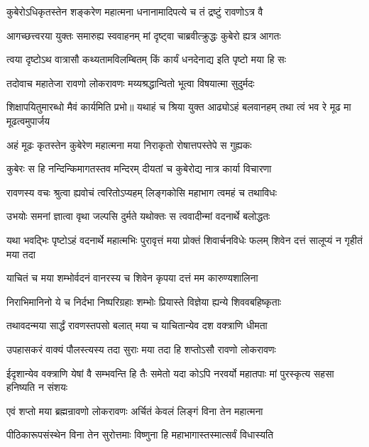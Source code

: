 
\twolineshloka
{कुबेरोऽधिकृतस्तेन शङ्करेण महात्मना}
{धनानामादिपत्ये च तं द्रष्टुं रावणोऽत्र वै}%

\twolineshloka
{आगच्छत्त्वरया युक्तः समारुह्य स्ववाहनम्}
{मां दृष्ट्वा चाब्रवीत्क्रुद्धः कुबेरो ह्यत्र आगतः}%

\twolineshloka
{त्वया दृष्टोऽथ वात्रासौ कथ्यतामविलम्बितम्}
{किं कार्यं धनदेनाद्य इति पृष्टो मया हि सः}%

\twolineshloka
{तदोवाच महातेजा रावणो लोकरावणः}
{मय्यश्रद्धान्वितो भूत्वा विषयात्मा सुदुर्मदः}%

\threelineshloka
{शिक्षापयितुमारब्धो मैवं कार्यमिति प्रभो॥}
{यथाहं च श्रिया युक्त आढ्योऽहं बलवानहम्}
{तथा त्वं भव रे मूढ मा मूढत्वमुपार्जय}%

\twolineshloka
{अहं मूढः कृतस्तेन कुबेरेण महात्मना}
{मया निराकृतो रोषात्तपस्तेपे स गुह्यकः}%

\twolineshloka
{कुबेरः स हि नन्दिन्किमागतस्तव मन्दिरम्}
{दीयतां च कुबेरोद्य नात्र कार्या विचारणा}%

\twolineshloka
{रावणस्य वचः श्रुत्वा ह्यवोचं त्वरितोऽप्यहम्}
{लिङ्गकोसि महाभाग त्वमहं च तथाविधः}%

\twolineshloka
{उभयोः समनां ज्ञात्वा वृथा जल्पसि दुर्मते}
{यथोक्तः स त्ववादीन्मां वदनार्थे बलोद्धतः}%

\threelineshloka
{यथा भवद्भिः पृष्टोऽहं वदनार्थे महात्मभिः}
{पुरावृत्तं मया प्रोक्तं शिवार्चनविधेः फलम्}
{शिवेन दत्तं सालूप्यं न गृहीतं मया तदा}%

\twolineshloka
{याचितं च मया शम्भोर्वदनं वानरस्य च}
{शिवेन कृपया दत्तं मम कारुण्यशालिना}%

\twolineshloka
{निराभिमानिनो ये च निर्दभा निष्परिग्रहाः}
{शम्भोः प्रियास्ते विज्ञेया ह्यन्ये शिववबहिष्कृताः}%

\twolineshloka
{तथावदन्मया सार्द्धं रावणस्तपसो बलात्}
{मया च याचितान्येव दश वक्त्राणि धीमता}%

\twolineshloka
{उपहासकरं वाक्यं पौलस्त्यस्य तदा सुराः}
{मया तदा हि शप्तोऽसौ रावणो लोकरावणः}%

\threelineshloka
{ईदृशान्येव वक्त्राणि येषां वै सम्भवन्ति हि}
{तैः समेतो यदा कोऽपि नरवर्यो महातपाः}
{मां पुरस्कृत्य सहसा हनिष्यति न संशयः}%

\twolineshloka
{एवं शप्तो मया ब्रह्मन्रावणो लोकरावणः}
{अर्चितं केवलं लिङ्गं विना तेन महात्मना}%

\twolineshloka
{पीठिकारूपसंस्थेन विना तेन सुरोत्तमाः}
{विष्णुना हि महाभागास्तस्मात्सर्वं विधास्यति}%

